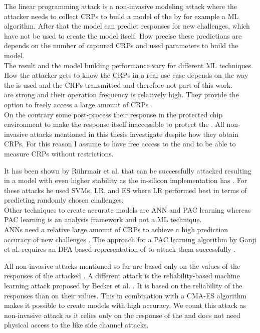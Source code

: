 The linear programming attack is a non-invasive modeling attack where the attacker needs to collect \acp{CRP} to build a model of the \puf by for example a \ac{ML} algorithm.
After that the model can predict responses for new challenges, which have not be used to create the model itself.
How precise these predictions are depends on the number of captured \acp{CRP} and used parameters to build the model.\\
The result and the model building performance vary for different \ac{ML} techniques.
How the attacker gets to know the \acp{CRP} in a real use case depends on the way the \puf is used and the \acp{CRP} transmitted and therefore not part of this work.\\
\apufs are strong \pufs and their operation frequency is relatively high.
They provide the option to freely access a large amount of \acp{CRP} \cite{Ruhrmair2010ModelingFunctions}.\\
On the contrary some \pufs post-process their response in the protected chip environment to make the \puf response itself inaccessible to protect the \puf \cite{Suh2007PhysicalGeneration, Gassend2004IdentificationCircuits}.
All non-invasive attacks mentioned in this thesis investigate \pufs despite how they obtain \acp{CRP}.
For this reason I assume to have free access to the \puf and to be able to measure \acp{CRP} without restrictions.

It has been shown by Rührmair et al. that \apufs can be successfully attacked resulting in a model with even higher stability as the \apuf in-silicon implementation has \cite{Ruhrmair2010ModelingFunctions}.
For these attacks he used \acp{SVM}, \ac{LR}, and \ac{ES} where \ac{LR} performed best in terms of predicting randomly chosen challenges.\\
Other techniques to create accurate \apuf models are \ac{ANN} and \ac{PAC} learning whereas \ac{PAC} learning is an analysis framework and not a \ac{ML} technique.\\
\acp{ANN} need a relative large amount of \acp{CRP} to achieve a high prediction accuracy of new challenges \cite{Hospodar2012MachineUsability}.
The approach for a \ac{PAC} learning algorithm by Ganji et al. requires an \ac{DFA} based representation of \apufs to attack them successfully \cite{Ganji2016PACPUFs}.

All non-invasive attacks mentioned so far are based only on the values of the responses of the attacked \puf.
A different attack is the reliability-based machine learning attack proposed by Becker et al. \cite{Becker2015ThePUFs}.
It is based on the reliability of the \puf responses than on their values. 
This in combination with a \ac{CMA-ES} algorithm makes it possible to create \apuf models with high accuracy.
We count this attack as non-invasive attack as it relies only on the response of the \puf and does not need physical access to the \puf like side channel attacks.

